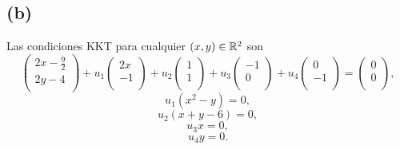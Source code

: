 \subsection*{(b)}

Las condiciones KKT para cualquier $(x, y) \in \mathbb{R}^2$ son
\begin{equation*}
    \begin{pmatrix}
        2x - \frac{9}{2} \\
        2y - 4 \\
    \end{pmatrix}
    +
    u_1
    \begin{pmatrix}
        2x \\
        -1 \\
    \end{pmatrix}
    + u_2
    \begin{pmatrix}
        1 \\
        1 \\
    \end{pmatrix}
    + u_3
    \begin{pmatrix}
        -1 \\
        0 \\
    \end{pmatrix}
    + u_4
    \begin{pmatrix}
        0 \\
        -1 \\
    \end{pmatrix}
    =
    \begin{pmatrix}
        0 \\
        0 \\
    \end{pmatrix},
\end{equation*}
\begin{equation*}
    u_1 (x^2 - y) = 0,
\end{equation*}
\begin{equation*}
    u_2 (x + y - 6) = 0,
\end{equation*}
\begin{equation*}
    u_3 x = 0,
\end{equation*}
\begin{equation*}
    u_4 y = 0.
\end{equation*}

